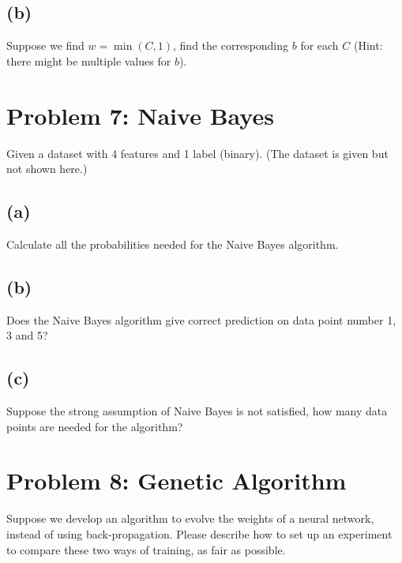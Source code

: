 \documentclass[a4paper,12pt]{article}
\begin{document}
\subsection*{(b)}

Suppose we find $w = \min(C, 1)$, find the corresponding $b$ for each $C$ (Hint: there might be multiple values for $b$).

\section*{Problem 7: Naive Bayes}

Given a dataset with 4 features and 1 label (binary). (The dataset is given but not shown here.)

\subsection*{(a)}

Calculate all the probabilities needed for the Naive Bayes algorithm.

\subsection*{(b)}

Does the Naive Bayes algorithm give correct prediction on data point number 1, 3 and 5?

\subsection*{(c)}

Suppose the strong assumption of Naive Bayes is not satisfied, how many data points are needed for the algorithm?

\section*{Problem 8: Genetic Algorithm}

Suppose we develop an algorithm to evolve the weights of a neural network, instead of using back-propagation. Please describe how to set up an experiment to compare these two ways of training, as fair as possible.
\end{document}
